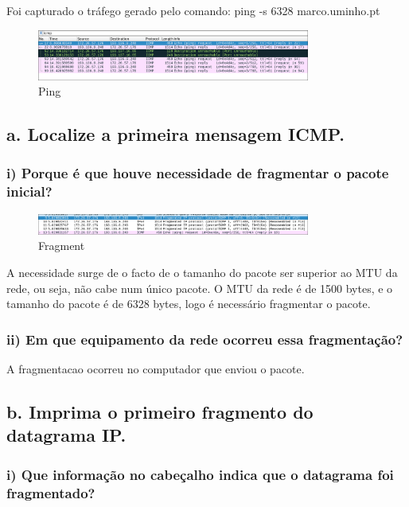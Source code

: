 \documentclass{article}
\begin{document}
Foi capturado o tráfego gerado pelo comando: ping -s 6328 marco.uminho.pt

\begin{figure}[h]
    \centering
    \includegraphics[width=0.8\textwidth]{images/ping.png}
    \caption{\label{fig:ping}Ping}
\end{figure}

\subsection*{a. Localize a primeira mensagem ICMP.}
\subsubsection*{i) Porque é que houve necessidade
de fragmentar o pacote inicial?}
\begin{figure}[h]
    \centering
    \includegraphics[width=0.8\textwidth]{images/fragment.png}
    \caption{\label{fig:fragment}Fragment}
\end{figure}

A necessidade surge de o facto de o tamanho do pacote ser superior ao MTU da rede, ou seja, não cabe num único pacote. O MTU da rede é de 1500 bytes, e o tamanho do pacote é de 6328 bytes, logo é necessário fragmentar o pacote.

\subsubsection*{ii) Em que equipamento da rede ocorreu
essa fragmentação?}

A fragmentacao ocorreu no computador que enviou o pacote. 

\subsection*{b. Imprima o primeiro fragmento do datagrama IP.}
\subsubsection*{i) Que informação no
cabeçalho indica que o datagrama foi fragmentado?}
\end{document}
